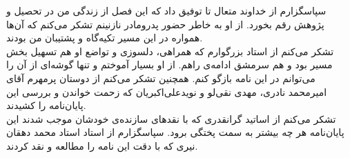
سپاسگزارم از خداوند متعال تا توفیق داد که این فصل از زندگی من در تحصیل و پژوهش رقم بخورد. از او به خاطر حضور پدرومادر نازنینم تشکر می‌کنم که آن‌ها همواره در این مسیر تکیه‌گاه و پشتیبان من بودند.\\
تشکر می‌کنم از استاد بزرگوارم که همراهی، دلسوزی و تواضع او هم تسهیل بخش مسیر بود و هم سرمشق ادامه‌ی راهم. از او بسیار آموختم و تنها گوشه‌ای از آن را می‌توانم در این نامه بازگو کنم. همچنین تشکر می‌کنم از دوستان پرمهرم آقای امیرمحمد نادری، مهدی نقی‌لو و نویدعلی‌اکبریان که زحمت خواندن و بررسی این پایان‌نامه را کشیدند.\\
تشکر می‌کنم از اساتید گرانقدری که با نقدهای سازنده‌ی خودشان موجب شدند این پایان‌نامه هر چه بیشتر به سمت پختگی برود. سپاسگزارم از استاد استاد محمد دهقان نیری که با دقت این نامه را مطالعه و نقد کردند.
